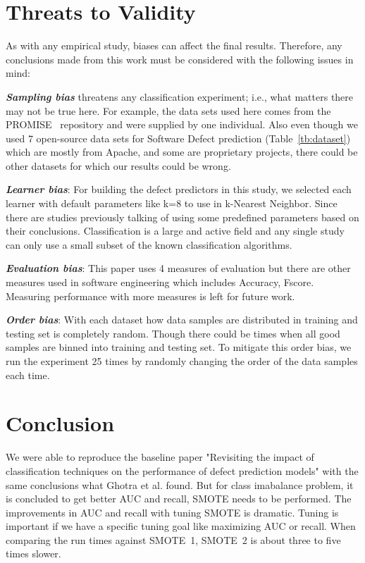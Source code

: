 \documentclass[sigconf,review, anonymous]{acmart}
\theoremstyle{break}
\begin{document}




\section{Threats to Validity}
\label{sect:validity}

As with any empirical study, biases can affect the final
results. Therefore, any conclusions made from this work must be considered with the following issues in mind:

\textbf{\textit{Sampling bias}} threatens any classification experiment; i.e., what matters there may not be true here. For example, the data sets used here comes from the PROMISE~\cite{promiserepo} repository and were supplied by one individual. Also even though we used 7 open-source data sets for Software Defect prediction (Table~\ref{tb:dataset}) which are mostly from Apache, and some are proprietary projects, there could be other datasets for which our results could be wrong.

\textbf{\textit{Learner bias}}: For building the defect predictors in this
study, we selected each learner with default parameters like k=8 to use in k-Nearest Neighbor. Since there are studies previously talking of using some predefined parameters based on their conclusions. Classification is a large and active field and any single study can only use a small subset of the known classification algorithms.

\textbf{\textit{Evaluation bias}}: This paper uses 4 measures of evaluation but there are other measures used in software engineering which includes Accuracy, Fscore. Measuring performance with more measures is left for future work.

\textbf{\textit{Order bias}}: With each dataset how data samples are distributed in training and testing set is completely random. Though there could be times when all good samples are binned into training and testing set. To mitigate this order bias, we run
the experiment 25 times by randomly changing the order of the data samples each time.

\section{Conclusion}
\label{sect:conclusion}

We were able to reproduce the baseline paper "Revisiting the impact of classification techniques on the performance of defect prediction models" with the same conclusions what Ghotra et al. found. But for class imabalance problem, it is concluded to get better AUC and recall, SMOTE needs to be performed. The improvements in AUC and recall with tuning SMOTE is dramatic. Tuning is important if we have a specific tuning goal like maximizing AUC or recall. When comparing the run times against SMOTE~1, SMOTE~2 is about three to five times slower.
\end{document}
